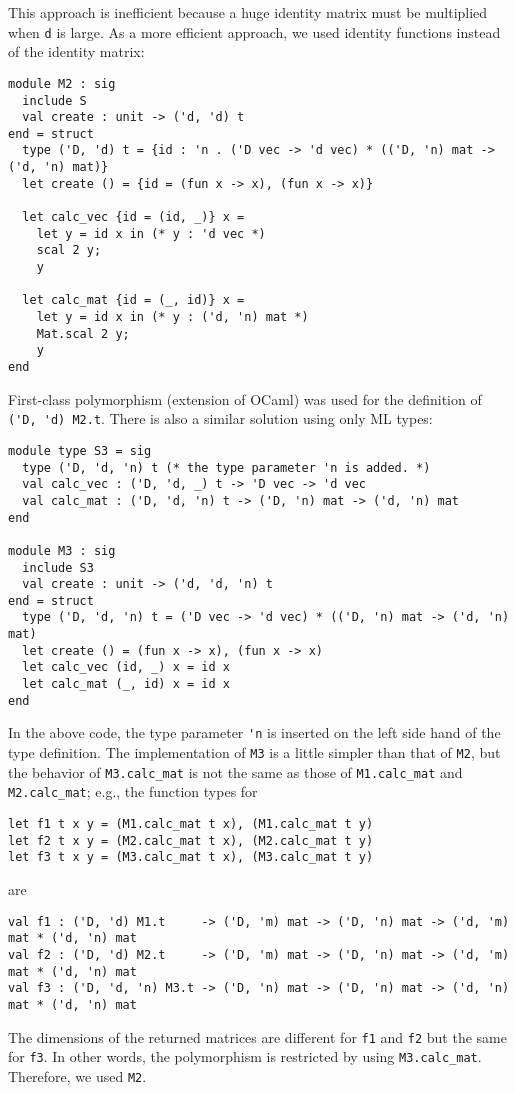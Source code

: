 \documentclass[10pt,a4paper]{article}
\begin{document}
This approach is inefficient because a huge identity matrix must be
multiplied when \lstinline|d| is large.
As a more efficient approach, we used identity functions instead of
the identity matrix:
\begin{lstlisting}
module M2 : sig
  include S
  val create : unit -> ('d, 'd) t
end = struct
  type ('D, 'd) t = {id : 'n . ('D vec -> 'd vec) * (('D, 'n) mat -> ('d, 'n) mat)}
  let create () = {id = (fun x -> x), (fun x -> x)}

  let calc_vec {id = (id, _)} x =
    let y = id x in (* y : 'd vec *)
    scal 2 y;
    y

  let calc_mat {id = (_, id)} x =
    let y = id x in (* y : ('d, 'n) mat *)
    Mat.scal 2 y;
    y
end
\end{lstlisting}
First-class polymorphism (extension of OCaml) was used for the definition of \lstinline|('D, 'd) M2.t|.
There is also a similar solution using only ML types:
\begin{lstlisting}
module type S3 = sig
  type ('D, 'd, 'n) t (* the type parameter 'n is added. *)
  val calc_vec : ('D, 'd, _) t -> 'D vec -> 'd vec
  val calc_mat : ('D, 'd, 'n) t -> ('D, 'n) mat -> ('d, 'n) mat
end

module M3 : sig
  include S3
  val create : unit -> ('d, 'd, 'n) t
end = struct
  type ('D, 'd, 'n) t = ('D vec -> 'd vec) * (('D, 'n) mat -> ('d, 'n) mat)
  let create () = (fun x -> x), (fun x -> x)
  let calc_vec (id, _) x = id x
  let calc_mat (_, id) x = id x
end
\end{lstlisting}
In the above code, the type parameter \lstinline|'n| is inserted on the left side hand
of the type definition. The implementation of \lstinline|M3| is a little simpler than that of
\lstinline|M2|, but the behavior of \lstinline|M3.calc_mat| is not the same as those of
\lstinline|M1.calc_mat| and \lstinline|M2.calc_mat|; e.g., the function types for
\begin{lstlisting}
let f1 t x y = (M1.calc_mat t x), (M1.calc_mat t y)
let f2 t x y = (M2.calc_mat t x), (M2.calc_mat t y)
let f3 t x y = (M3.calc_mat t x), (M3.calc_mat t y)
\end{lstlisting}
are
\begin{lstlisting}
val f1 : ('D, 'd) M1.t     -> ('D, 'm) mat -> ('D, 'n) mat -> ('d, 'm) mat * ('d, 'n) mat
val f2 : ('D, 'd) M2.t     -> ('D, 'm) mat -> ('D, 'n) mat -> ('d, 'm) mat * ('d, 'n) mat
val f3 : ('D, 'd, 'n) M3.t -> ('D, 'n) mat -> ('D, 'n) mat -> ('d, 'n) mat * ('d, 'n) mat
\end{lstlisting}
The dimensions of the returned matrices are different for \lstinline|f1| and \lstinline|f2|
but the same for \lstinline|f3|.
In other words, the polymorphism is restricted by using \lstinline|M3.calc_mat|.
Therefore, we used \lstinline|M2|.
\end{document}
